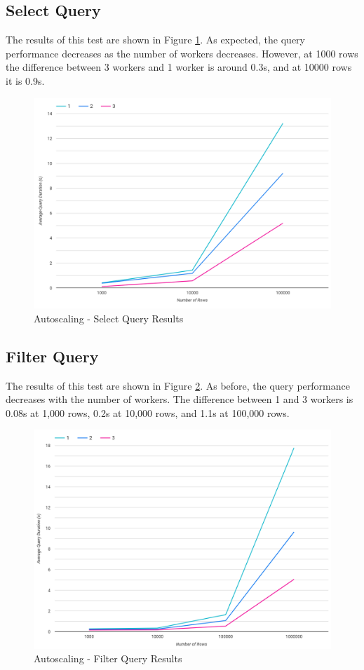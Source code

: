 \subsection{Select Query}
The results of this test are shown in Figure \ref{fig:select-simple-autoscale-test}. As expected, the query performance decreases as the number of workers decreases. However, at 1000 rows the difference between 3 workers and 1 worker is around 0.3s, and at 10000 rows it is 0.9s.

\begin{figure}[ht]
	\centering
	\includegraphics[width=0.8\linewidth]{chapters/diagrams/testing/select-simple-autoscale-test}
	\caption{Autoscaling - Select Query Results}
	\label{fig:select-simple-autoscale-test}
\end{figure}

\subsection{Filter Query}
The results of this test are shown in Figure \ref{fig:filter-simple-autoscale-test}. As before, the query performance decreases with the number of workers. The difference between 1 and 3 workers is 0.08s at 1,000 rows, 0.2s at 10,000 rows, and 1.1s at 100,000 rows.

\begin{figure}[ht]
	\centering
	\includegraphics[width=0.8\linewidth]{chapters/diagrams/testing/filter-simple-autoscale-test}
	\caption{Autoscaling - Filter Query Results}
	\label{fig:filter-simple-autoscale-test}
\end{figure}

